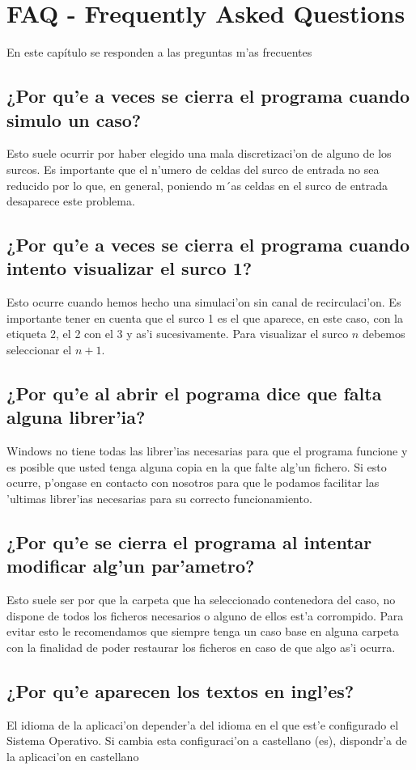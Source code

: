 \chapter{FAQ - Frequently Asked Questions}

En este capítulo se responden a las preguntas m'as frecuentes

\section{¿Por qu'e a veces se cierra el programa cuando simulo un caso?}

Esto suele ocurrir por haber elegido una mala discretizaci'on de alguno de los surcos. Es importante que el n'umero de celdas del surco de entrada no sea reducido por lo que, en general, poniendo m´as celdas en el surco de entrada desaparece este problema. 

\section{¿Por qu'e a veces se cierra el programa cuando intento visualizar el surco 1?}

Esto ocurre cuando hemos hecho una simulaci'on sin canal de recirculaci'on. Es importante tener en cuenta que el surco 1 es el que aparece, en este caso, con la etiqueta 2, el 2 con el 3 y as'i sucesivamente. Para visualizar el surco $ n $ debemos seleccionar el $ n+1 $.

\section{¿Por qu'e al abrir el pograma dice que falta alguna librer'ia?}

Windows no tiene todas las librer'ias necesarias para que el programa funcione y es posible que usted tenga alguna copia en la que falte alg'un fichero. Si esto ocurre, p'ongase en contacto con nosotros para que le podamos facilitar las 'ultimas librer'ias necesarias para su correcto funcionamiento.

\section{¿Por qu'e se cierra el programa al intentar modificar alg'un par'ametro?}

Esto suele ser por que la carpeta que ha seleccionado contenedora del caso, no dispone de todos los ficheros necesarios o alguno de ellos est'a corrompido. Para evitar esto le recomendamos que siempre tenga un caso base en alguna carpeta con la finalidad de poder restaurar los ficheros en caso de que algo as'i ocurra. 

\section{¿Por qu'e aparecen los textos en ingl'es?}

El idioma de la aplicaci'on depender'a del idioma en el que est'e configurado el Sistema Operativo. Si cambia esta configuraci'on a castellano (es), dispondr'a de la aplicaci'on en castellano
